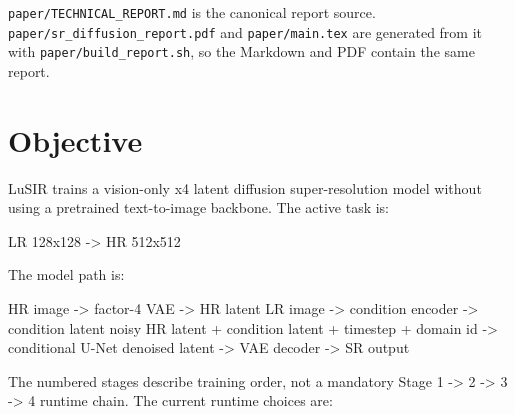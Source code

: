 \documentclass[
  10pt,
]{article}
\newenvironment{Shaded}{}{}
\newcommand{\NormalTok}[1]{#1}
\begin{document}
\texttt{paper/TECHNICAL\_REPORT.md} is the canonical report source.
\texttt{paper/sr\_diffusion\_report.pdf} and \texttt{paper/main.tex} are
generated from it with \texttt{paper/build\_report.sh}, so the Markdown
and PDF contain the same report.

\hypertarget{objective}{%
\section{Objective}\label{objective}}

LuSIR trains a vision-only x4 latent diffusion super-resolution model
without using a pretrained text-to-image backbone. The active task is:

\begin{Shaded}
\begin{Highlighting}[]
\NormalTok{LR 128x128 {-}\textgreater{} HR 512x512}
\end{Highlighting}
\end{Shaded}

The model path is:

\begin{Shaded}
\begin{Highlighting}[]
\NormalTok{HR image {-}\textgreater{} factor{-}4 VAE {-}\textgreater{} HR latent}
\NormalTok{LR image {-}\textgreater{} condition encoder {-}\textgreater{} condition latent}
\NormalTok{noisy HR latent + condition latent + timestep + domain id {-}\textgreater{} conditional U{-}Net}
\NormalTok{denoised latent {-}\textgreater{} VAE decoder {-}\textgreater{} SR output}
\end{Highlighting}
\end{Shaded}

The numbered stages describe training order, not a mandatory Stage 1
-\textgreater{} 2 -\textgreater{} 3 -\textgreater{} 4 runtime chain. The
current runtime choices are:
\end{document}
